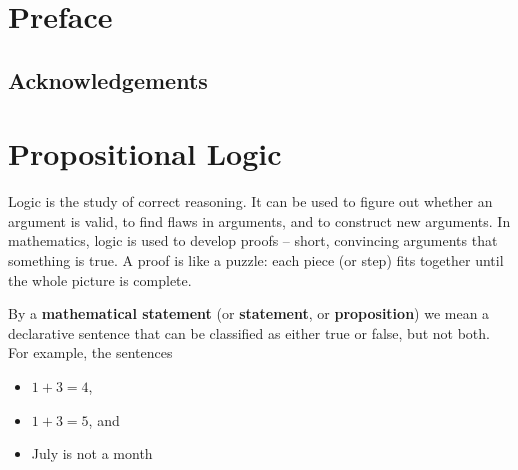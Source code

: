 \documentclass[
  letterpaper,
  10pt,
  reqno,
  twopage,
  openany]{book}
\providecommand{\tightlist}{%
  \setlength{\itemsep}{0pt}\setlength{\parskip}{0pt}}\usepackage{longtable,booktabs,array}
\theoremstyle{plain}
\theoremstyle{definition}
\theoremstyle{definition}
\theoremstyle{definition}
\theoremstyle{plain}
\theoremstyle{plain}
\theoremstyle{remark}
\begin{document}
\ifdefined\Shaded\renewenvironment{Shaded}{\begin{tcolorbox}[frame hidden, borderline west={3pt}{0pt}{shadecolor}, sharp corners, breakable, enhanced, interior hidden, boxrule=0pt]}{\end{tcolorbox}}\fi

\mainmatter
{}

\hypertarget{preface}{%
\chapter*{Preface}\label{preface}}


\pagestyle{preface}

\hypertarget{acknowledgements}{%
\section*{Acknowledgements}\label{acknowledgements}}


\setcounter{secnumdepth}{1}
\setcounter{tocdepth}{1}
\clearpage
\pagestyle{toc} 
\tableofcontents
\mainmatter 
{}
\pagestyle{fancy}


\hypertarget{propositional-logic}{%
\chapter{Propositional Logic}\label{propositional-logic}}

Logic is the study of correct reasoning. It can be used to figure out
whether an argument is valid, to find flaws in arguments, and to
construct new arguments. In mathematics, logic is used to develop proofs
-- short, convincing arguments that something is true. A proof is like a
puzzle: each piece (or step) fits together until the whole picture is
complete.

By a  \textbf{mathematical statement} (or
 \textbf{statement}, or 
\textbf{proposition}) we mean a declarative sentence that can be
classified as either true or false, but not both. For example, the
sentences

\begin{itemize}
\tightlist
\item
  \(1+3=4\),
\item
  \(1+3=5\), and
\item
  July is not a month
\end{itemize}
\end{document}
